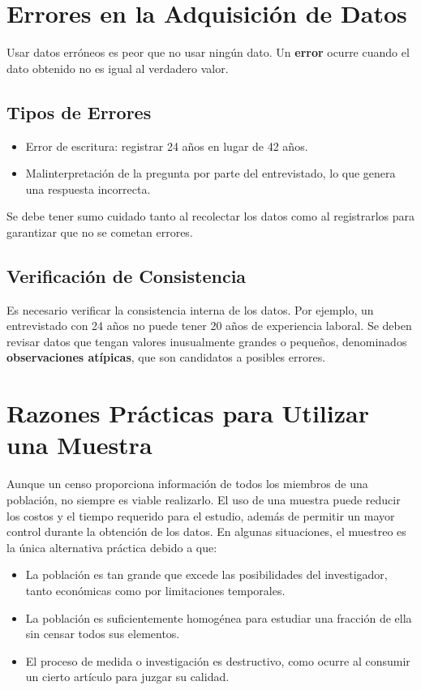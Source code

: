 \section{Errores en la Adquisición de Datos}

Usar datos erróneos es peor que no usar ningún dato. Un \textbf{error} ocurre cuando el dato obtenido no es igual al verdadero valor.

\subsection{Tipos de Errores}

\begin{itemize}
    \item Error de escritura: registrar 24 años en lugar de 42 años.
    \item Malinterpretación de la pregunta por parte del entrevistado, lo que genera una respuesta incorrecta.
\end{itemize}

Se debe tener sumo cuidado tanto al recolectar los datos como al registrarlos para garantizar que no se cometan errores.

\subsection{Verificación de Consistencia}

Es necesario verificar la consistencia interna de los datos. Por ejemplo, un entrevistado con 24 años no puede tener 20 años de experiencia laboral. Se deben revisar datos que tengan valores inusualmente grandes o pequeños, denominados \textbf{observaciones atípicas}, que son candidatos a posibles errores.

\section{Razones Prácticas para Utilizar una Muestra}

Aunque un censo proporciona información de todos los miembros de una población, no siempre es viable realizarlo. El uso de una muestra puede reducir los costos y el tiempo requerido para el estudio, además de permitir un mayor control durante la obtención de los datos. En algunas situaciones, el muestreo es la única alternativa práctica debido a que:

\begin{itemize}
    \item La población es tan grande que excede las posibilidades del investigador, tanto económicas como por limitaciones temporales.
    \item La población es suficientemente homogénea para estudiar una fracción de ella sin censar todos sus elementos.
    \item El proceso de medida o investigación es destructivo, como ocurre al consumir un cierto artículo para juzgar su calidad.
\end{itemize}

